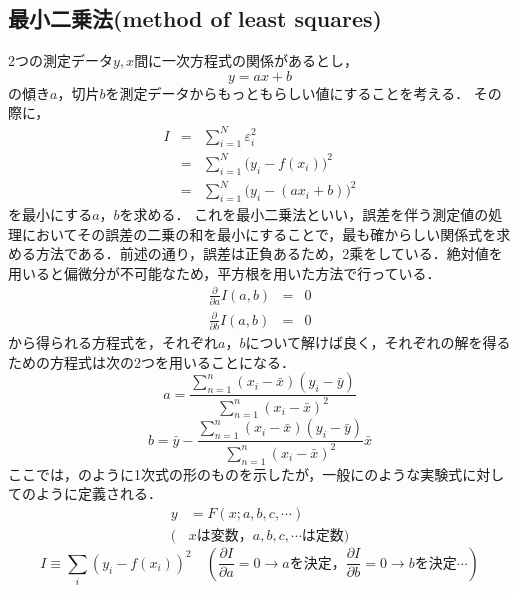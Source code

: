 \subsection{最小二乗法(method of least squares)\cite{1130848328216058496}\cite{1130282272174486912}}
2つの測定データ$y, x$間に一次方程式の関係があるとし，
\begin{equation}
	y = ax + b
	\label{eq:aiu}
\end{equation}
の傾き$a$，切片$b$を測定データからもっともらしい値にすることを考える．
その際に，
\begin{eqnarray}
	I &=& \sum\limits_{i=1}^{N} \varepsilon^2_i \nonumber\\
	&=& \sum\limits_{i=1}^{N} \bigl( y_i - f(x_i)\bigr)^2\nonumber\\\
	&=& \sum\limits_{i=1}^{N} \bigl( y_i - (ax_i+b)\bigr)^2
	\label{eq:error}
\end{eqnarray}
を最小にする$a$，$b$を求める．
これを最小二乗法といい，誤差を伴う測定値の処理においてその誤差の二乗の和を最小にすることで，最も確からしい関係式を求める方法である．前述の通り，誤差は正負あるため，2乘をしている．絶対値を用いると偏微分が不可能なため，平方根を用いた方法で行っている．
\begin{eqnarray}
	\frac{\partial}{\partial a}I(a,b) &=& 0\\
	\frac{\partial}{\partial b}I(a,b) &=& 0
\end{eqnarray}
から得られる方程式を，それぞれ$a$，$b$について解けば良く，それぞれの解を得るための方程式は次の2つを用いることになる．
\begin{equation}
	a = \frac{\sum_{n=1}^{n}(x_i -\bar{x})(y_i-\bar{y})}{\sum_{n=1}^{n}(x_i-\bar{x})^2}
	\label{eq:saisyou1}
\end{equation}
\begin{equation}
	b = \bar{y}-\frac{\sum_{n=1}^{n}(x_i -\bar{x})(y_i-\bar{y})}{\sum_{n=1}^{n}(x_i-\bar{x})^2} \bar{x}
	\label{eq:saisyou2}
\end{equation}
ここでは，のように1次式の形のものを示したが，一般にのような実験式に対してのように定義される．
\begin{align}
y&=F(x;a,b,c,\cdots)\label{eq:ippan}\\
(&xは変数，a,b,c,\cdots は定数)\nonumber
\end{align}
\begin{equation}
\label{eq:least-i}
I \equiv \sum_{i} (y_{i}-f(x_{i}))^{2} \quad \left(\frac{\partial I}{\partial a}=0 \to aを決定，\frac{\partial I}{\partial b}=0 \to bを決定 \cdots \right)
\end{equation}

